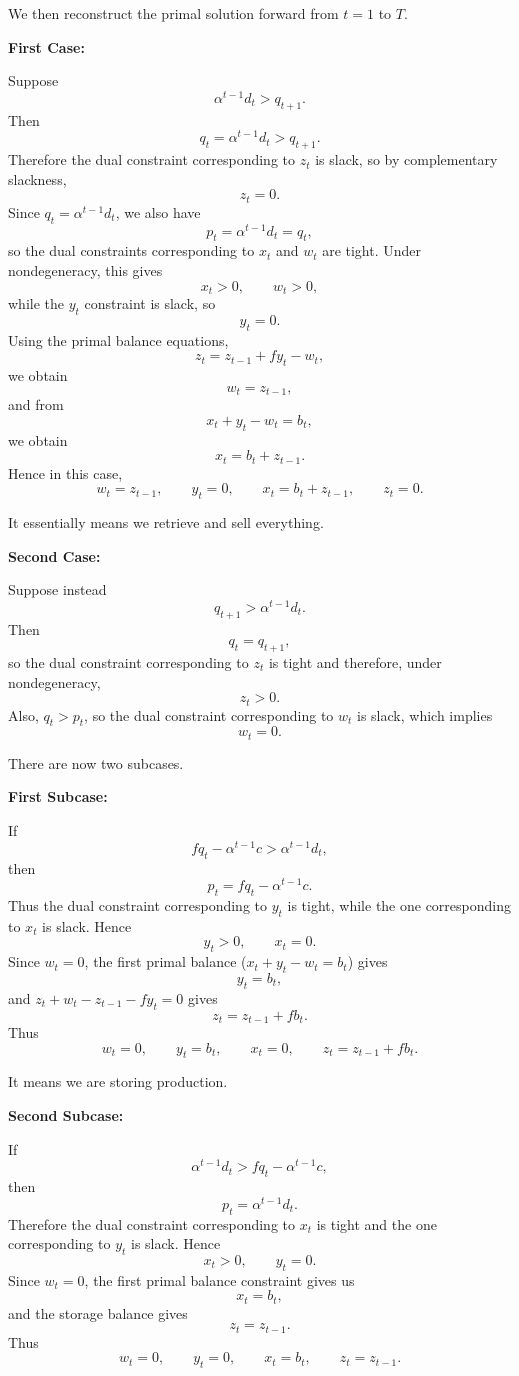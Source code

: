 \documentclass{article}
\begin{document}
We then reconstruct the primal solution forward from $t=1$ to $T$.

\textbf{First Case:}


Suppose
\[
\alpha^{t-1}d_t>q_{t+1}.
\]
Then
\[
q_t=\alpha^{t-1}d_t>q_{t+1}.
\]
Therefore the dual constraint corresponding to $z_t$ is slack, so by
complementary slackness,
\[
z_t=0.
\]
Since $q_t=\alpha^{t-1}d_t$, we also have
\[
p_t=\alpha^{t-1}d_t=q_t,
\]
so the dual constraints corresponding to $x_t$ and $w_t$ are tight.
Under nondegeneracy, this gives
\[
x_t>0,\qquad w_t>0,
\]
while the $y_t$ constraint is slack, so
\[
y_t=0.
\]
Using the primal balance equations,
\[
z_t=z_{t-1}+fy_t-w_t,
\]
we obtain
\[
w_t=z_{t-1},
\]
and from
\[
x_t+y_t-w_t=b_t,
\]
we obtain
\[
x_t=b_t+z_{t-1}.
\]
Hence in this case,
\[
\boxed{
w_t=z_{t-1},\qquad
y_t=0,\qquad
x_t=b_t+z_{t-1},\qquad
z_t=0.}
\]

It essentially means we retrieve and sell everything. 


\vspace{3mm}
\textbf{Second Case:}


Suppose instead
\[
q_{t+1}>\alpha^{t-1}d_t.
\]
Then
\[
q_t=q_{t+1},
\]
so the dual constraint corresponding to $z_t$ is tight and therefore,
under nondegeneracy,
\[
z_t>0.
\]
Also, $q_t>p_t$, so the dual constraint corresponding to $w_t$ is
slack, which implies
\[
w_t=0.
\]

There are now two subcases.

\newpage
\textbf{First Subcase:}


If
\[
fq_t-\alpha^{t-1}c>\alpha^{t-1}d_t,
\]
then
\[
p_t=fq_t-\alpha^{t-1}c.
\]
Thus the dual constraint corresponding to $y_t$ is tight, while the one
corresponding to $x_t$ is slack. Hence
\[
y_t>0,\qquad x_t=0.
\]
Since $w_t=0$, the first primal balance ($x_t + y_t - w_t = b_t$) gives
\[
y_t=b_t,
\]
and $z_t + w_t - z_{t-1} - fy_t = 0$ gives
\[
z_t=z_{t-1}+fb_t.
\]
Thus
\[
\boxed{
w_t=0,\qquad
y_t=b_t,\qquad
x_t=0,\qquad
z_t=z_{t-1}+fb_t.}
\]

It means we are storing production.

\vspace{3mm}

\textbf{Second Subcase:}



If
\[
\alpha^{t-1}d_t>fq_t-\alpha^{t-1}c,
\]
then
\[
p_t=\alpha^{t-1}d_t.
\]
Therefore the dual constraint corresponding to $x_t$ is tight and the
one corresponding to $y_t$ is slack. Hence
\[
x_t>0,\qquad y_t=0.
\]
Since $w_t=0$, the first primal balance constraint gives us
\[
x_t=b_t,
\]
and the storage balance gives
\[
z_t=z_{t-1}.
\]
Thus
\[
\boxed{w_t=0,\qquad
y_t=0,\qquad
x_t=b_t,\qquad
z_t=z_{t-1}.}
\]
\end{document}
